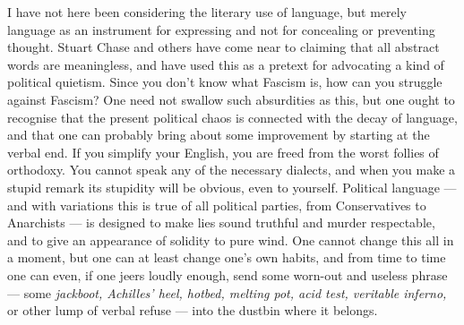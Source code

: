 \documentclass[12pt]{article}
\begin{document}
I have not here been considering the literary use of language, but merely language as an instrument for expressing and not for concealing or preventing thought. Stuart Chase and others have come near to claiming that all abstract words are meaningless, and have used this as a pretext for advocating a kind of political quietism. Since you don't know what Fascism is, how can you struggle against Fascism? One need not swallow such absurdities as this, but one ought to recognise that the present political chaos is connected with the decay of language, and that one can probably bring about some improvement by starting at the verbal end. If you simplify your English, you are freed from the worst follies of orthodoxy. You cannot speak any of the necessary dialects, and when you make a stupid remark its stupidity will be obvious, even to yourself. Political language — and with variations this is true of all political parties, from Conservatives to Anarchists — is designed to make lies sound truthful and murder respectable, and to give an appearance of solidity to pure wind. One cannot change this all in a moment, but one can at least change one's own habits, and from time to time one can even, if one jeers loudly enough, send some worn-out and useless phrase — some \textit{jackboot, Achilles’ heel, hotbed, melting pot, acid test, veritable inferno,} or other lump of verbal refuse — into the dustbin where it belongs.
\theendnotes
\end{document}
